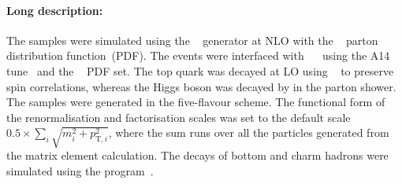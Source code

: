 \paragraph{Long description:}

The \tHW{} samples were simulated using the \MGNLO[2.6.2]~\cite{Alwall:2014hca}
generator at NLO with the \NNPDF[3.0nlo]~\cite{Ball:2014uwa} parton distribution function~(PDF). The events were interfaced with
\PYTHIA[8.235]~\cite{Sjostrand:2014zea}~ using the A14 tune~\cite{ATL-PHYS-PUB-2014-021} and the \NNPDF[2.3lo]~\cite{Ball:2014uwa} PDF set.
The top quark was decayed at LO using \MADSPIN~\cite{Frixione:2007zp,Artoisenet:2012st} to preserve spin correlations,
whereas the Higgs boson was decayed by \PYTHIA in the parton shower. The samples
were generated in the five-flavour scheme.
The functional form of the renormalisation and factorisation scales was set to the
default scale \(0.5\times \sum_i \sqrt{m^2_i+p^2_{\text{T},i}}\), where the sum runs over
all the particles generated from the matrix element calculation.
The decays of bottom and charm hadrons were simulated using the \EVTGEN[1.6.0] program~\cite{Lange:2001uf}.
